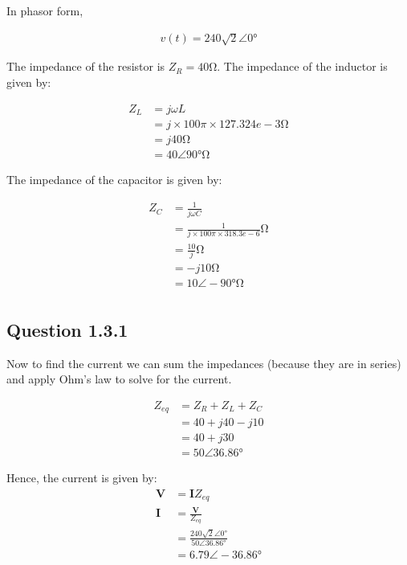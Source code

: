 \documentclass[paper=a4, fontsize=11pt]{scrartcl} %
\numberwithin{equation}{section} %
\numberwithin{figure}{section} %
\numberwithin{table}{section} %
\begin{document}
In phasor form,

\begin{align*}
v(t) = 240\sqrt{2}\angle 0\si{\degree}
\end{align*}

\newpage

The impedance of the resistor is $Z_{R} = 40 \si{\ohm}$. The impedance of the inductor is given by:

\begin{align*}
Z_{L} &= j\omega L \\
&= j \times 100\pi \times 127.324e-3 \si{\ohm} \\
&= j40 \si{\ohm} \\
&= 40 \angle 90 \si{\degree} \si{\ohm}
\end{align*}

The impedance of the capacitor is given by:

\begin{align*}
Z_{C} &= \frac{1}{j \omega C} \\
&= \frac{1}{j \times 100\pi \times 318.3e-6} \si{\ohm} \\
&= \frac{10}{j} \si{\ohm} \\
&= -j10 \si{\ohm} \\
&= 10 \angle -90 \si{\degree} \si{\ohm} \\
\end{align*}

\subsection*{Question 1.3.1}
Now to find the current we can sum the impedances (because they are in series) and apply Ohm's law to solve for the current.

\begin{align*}
Z_{eq} &= Z_{R} + Z_{L} + Z_{C} \\
&= 40 + j40 - j10 \\
&= 40 + j30 \\
&= 50 \angle 36.86 \si{\degree}
\end{align*}

Hence, the current is given by:
\begin{align*}
\textbf{V} &= \textbf{I}Z_{eq} \\
\textbf{I} &= \frac{\textbf{V}}{Z_{eq}} \\
&= \frac{240 \sqrt{2} \angle 0 \si{\degree}}{50 \angle 36.86 \si{\degree}} \\
&= 6.79 \angle -36.86\si{\degree}
\end{align*}
\end{document}
